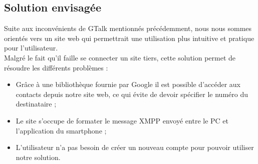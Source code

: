 
\subsection{Solution envisagée}

Suite aux inconvénients de GTalk mentionnés précédemment, nous nous sommes orientés vers un site web qui permettrait une utilisation plus intuitive et pratique pour l'utilisateur.
\\

Malgré le fait qu'il faille se connecter un site tiers, cette solution permet de résoudre les différents problèmes :
\begin{itemize}
	\item Grâce à une bibliothèque fournie par Google il est possible d'accéder aux contacts depuis notre site web, ce qui évite de devoir spécifier le numéro du destinataire ;
	\item Le site s'occupe de formater le message XMPP envoyé entre le PC et l'application du smartphone ;
	\item L'utilisateur n'a pas besoin de créer un nouveau compte pour pouvoir utiliser notre solution.
\\
\end{itemize}

